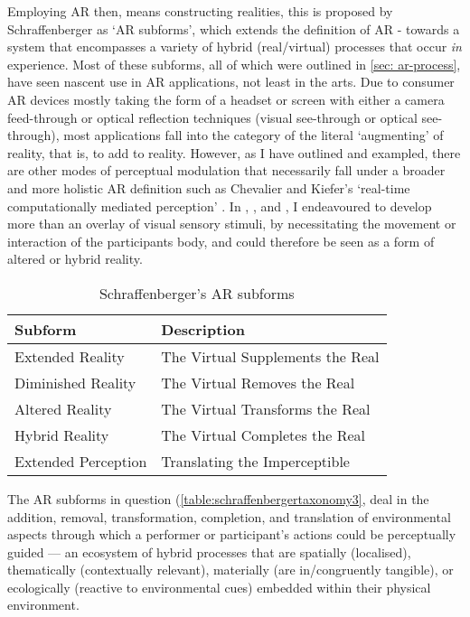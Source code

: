 Employing AR then, means constructing realities, this is proposed by Schraffenberger as `AR subforms', which extends the definition of AR - towards a system that encompasses a variety of hybrid (real/virtual) processes that occur \textit{in} experience. Most of these subforms, all of which were outlined in \autoref{sec: ar-process}, have seen nascent use in AR applications, not least in the arts. Due to consumer AR devices mostly taking the form of a headset or screen with either a camera feed-through or optical reflection techniques (visual see-through or optical see-through), most applications fall into the category of the literal `augmenting' of reality, that is, to add to reality. However, as I have outlined and exampled, there are other modes of perceptual modulation that necessarily fall under a broader and more holistic AR definition such as Chevalier and Kiefer's `real-time computationally mediated perception' \citeyearpar[]{chevalier2020}. In \textit{}, \textit{}, and \textit{}, I endeavoured to develop more than an overlay of visual sensory stimuli, by necessitating the movement or interaction of the participants body, and could therefore be seen as a form of altered or hybrid reality.

\begin{table}
    \centering
    \begin{tabular}{ l l }
        \toprule
        Subform             & Description                       \\
        \midrule
        Extended Reality    & The Virtual Supplements the Real  \\
        Diminished Reality  & The Virtual Removes the Real      \\
        Altered Reality     & The Virtual Transforms the Real   \\
        Hybrid Reality      & The Virtual Completes the Real    \\
        Extended Perception & Translating the Imperceptible     \\
        \bottomrule
    \end{tabular}
    \caption{Schraffenberger's AR subforms}\label{table:schraffenbergertaxonomy3}
\end{table}

The AR subforms in question (\autoref{table:schraffenbergertaxonomy3}, deal in the addition, removal, transformation, completion, and translation of environmental aspects through which a performer or participant's actions could be perceptually guided — an ecosystem of hybrid processes that are spatially (localised), thematically (contextually relevant), materially (are in/congruently tangible), or ecologically (reactive to environmental cues) embedded within their physical environment.

